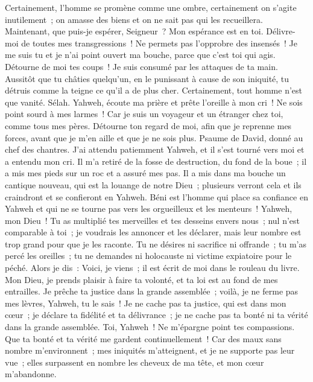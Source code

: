 \begin{multicols}{2}
Certainement, l'homme se promène comme une ombre, certainement on s'agite inutilement~; on amasse des biens et on ne sait pas qui les recueillera.
Maintenant, que puis-je espérer, Seigneur~? Mon espérance est en toi.
Délivre-moi de toutes mes transgressions~! Ne permets pas l'opprobre des insensés~!
Je me suis tu et je n'ai point ouvert ma bouche, parce que c'est toi qui agis.
Détourne de moi tes coups~! Je suis consumé par les attaques de ta main.
Aussitôt que tu châties quelqu'un, en le punissant à cause de son iniquité, tu détruis comme la teigne ce qu'il a de plus cher. Certainement, tout homme n'est que vanité. Sélah.
Yahweh, écoute ma prière et prête l'oreille à mon cri~! Ne sois point sourd à mes larmes~! Car je suis un voyageur et un étranger chez toi, comme tous mes pères.
Détourne ton regard de moi, afin que je reprenne mes forces, avant que je m'en aille et que je ne sois plus.
\VerseOne{}Psaume de David, donné au chef des chantres.
J'ai attendu patiemment Yahweh, et il s'est tourné vers moi et a entendu mon cri.
Il m'a retiré de la fosse de destruction, du fond de la boue~; il a mis mes pieds sur un roc et a assuré mes pas.
Il a mis dans ma bouche un cantique nouveau, qui est la louange de notre Dieu~; plusieurs verront cela et ils craindront et se confieront en Yahweh.
Béni est l'homme qui place sa confiance en Yahweh et qui ne se tourne pas vers les orgueilleux et les menteurs~!
Yahweh, mon Dieu~! Tu as multiplié tes merveilles et tes desseins envers nous~; nul n'est comparable à toi~; je voudrais les annoncer et les déclarer, mais leur nombre est trop grand pour que je les raconte.
Tu ne désires ni sacrifice ni offrande~; tu m'as percé les oreilles~; tu ne demandes ni holocauste ni victime expiatoire pour le péché.
Alors je dis~: Voici, je viens~; il est écrit de moi dans le rouleau du livre.
Mon Dieu, je prends plaisir à faire ta volonté, et ta loi est au fond de mes entrailles.
Je prêche ta justice dans la grande assemblée~; voilà, je ne ferme pas mes lèvres, Yahweh, tu le sais~!
Je ne cache pas ta justice, qui est dans mon cœur~; je déclare ta fidélité et ta délivrance~; je ne cache pas ta bonté ni ta vérité dans la grande assemblée.
Toi, Yahweh~! Ne m'épargne point tes compassions. Que ta bonté et ta vérité me gardent continuellement~!
Car des maux sans nombre m'environnent~; mes iniquités m'atteignent, et je ne supporte pas leur vue~; elles surpassent en nombre les cheveux de ma tête, et mon cœur m'abandonne.

\end{multicols}
